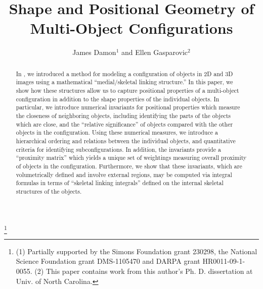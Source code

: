 \documentclass[10pt]{amsart}
\theoremstyle{definition}
\theoremstyle{definition}
\numberwithin{equation}{section}
\begin{document}
 

\title[Shape and Positional Geometry] {Shape and Positional Geometry of 
Multi-Object Configurations} 
\author[James Damon and Ellen Gasparovic ]{James Damon$^1$ and Ellen 
Gasparovic$^2$} 
\thanks{(1) Partially supported by the Simons Foundation grant 230298, 
the National Science Foundation grant DMS-1105470 and DARPA grant 
HR0011-09-1-0055. (2) This paper contains work from this author's Ph. D. 
dissertation at Univ. of North Carolina.} 
\address{Dept. of Mathematics \\ 
University of North Carolina \\ 
Chapel Hill, NC 27599-3250 }
\address{Dept. of Mathematics \\
 Union College \\
Schenectady, NY 12308
}




\begin{abstract}
In \cite{DG1}, we introduced a method for modeling a configuration of 
objects in 2D and 3D images using a mathematical ``medial/skeletal 
linking structure.''  In this paper, we show how these structures 
allow us to capture positional properties of a multi-object configuration 
in addition to the shape properties of the individual objects.  
In particular, we introduce numerical invariants 
for positional properties which measure the closeness of neighboring 
objects, including identifying the parts of the objects which are close, 
and the ``relative significance'' of objects compared with the 
other objects in the configuration.  Using these numerical measures, we 
introduce a hierarchical ordering and relations between the individual 
objects, and quantitative criteria for identifying subconfigurations.  In 
addition, the invariants provide a ``proximity matrix'' which 
yields a unique set of weightings measuring overall proximity of objects 
in the configuration.    
Furthermore, we show that these invariants, which are volumetrically 
defined and involve external regions, may be computed via integral 
formulas in terms of ``skeletal linking integrals'' defined on the 
internal skeletal structures of the objects.  
\end{abstract}

\end{document}

